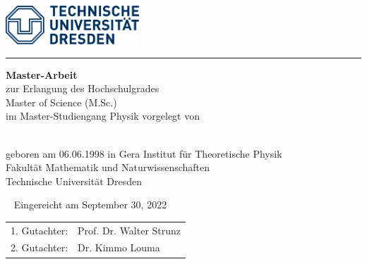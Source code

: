 \makeatletter
\thispagestyle{empty}
\begin{titlepage}
  \includegraphics[width=5cm]{figs/logo.pdf}
  \vspace{1em}
  \hrule

  {\centering {} \vspace*{5em} {\bfseries\Huge \@title}
    \vfill \vfill
    {\large {\bfseries Master-Arbeit} \\
      zur Erlangung des Hochschulgrades\\
      Master of Science (M.Sc.)\\
      im Master-Studiengang Physik}
    \vfill vorgelegt von \vspace{1em}

  {{\large \@author} \\
  geboren am 06.06.1998 in Gera}
  \vfill
  {\large Institut f\"ur Theoretische Physik\\
    Fakultät Mathematik und Naturwissenschaften\\
    Technische Universität Dresden \\}
}

\newpage \thispagestyle{empty}\ \newpage
\clearpage
\thispagestyle{empty}
\null\vfill
{\large Eingereicht am September 30, 2022}

\begin{tabular*}{.5\linewidth}[h]{ll}
  1. Gutachter: & Prof. Dr. Walter Strunz \\
  2. Gutachter: & Dr. Kimmo Louma \\
\end{tabular*}
\end{titlepage}
\makeatother

